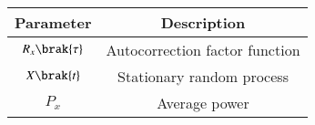 \begin{tabular}{|c|c|}
	\hline
	\textbf{Parameter} & \textbf{Description} \\[6pt]
	\hline
     $R_x\brak{\tau}$ & Autocorrection factor function \\
     \hline
     $ X\brak{t}$ & Stationary random process \\
    \hline
    $ P_x$ & Average power\\
    \hline
\end{tabular}

